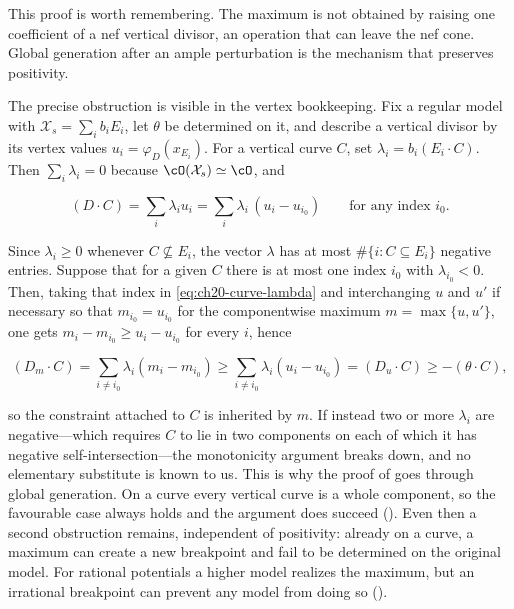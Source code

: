 \begin{remark}
\label{rem:ch20-why-max-is-hard}
This proof is worth remembering.  The maximum is not obtained by raising
one coefficient of a nef vertical divisor, an operation that can leave the
nef cone.  Global generation after an ample perturbation is the mechanism
that preserves positivity.

The precise obstruction is visible in the vertex bookkeeping.  Fix a regular
model with $\mathcal X_s=\sum_ib_iE_i$, let $\theta$ be determined on
it, and describe a vertical divisor by its vertex values
$u_i=\varphi_D(x_{E_i})$.  For a vertical curve $C$, set
$\lambda_i=b_i(E_i\cdot C)$.  Then $\sum_i\lambda_i=0$ because
$\cO(\mathcal X_s)\simeq\cO$, and

\begin{equation}
\label{eq:ch20-curve-lambda}
 (D\cdot C)=\sum_i\lambda_iu_i
 =\sum_{i}\lambda_i\,(u_i-u_{i_0})
 \qquad\text{for any index }i_0 .
\end{equation}

Since $\lambda_i\geq0$ whenever $C\not\subseteq E_i$, the vector
$\lambda$ has at most $\#\{i:C\subseteq E_i\}$ negative entries.  Suppose
that for a given $C$ there is at most one index $i_0$ with
$\lambda_{i_0}<0$.  Then, taking that index in
\eqref{eq:ch20-curve-lambda} and interchanging $u$ and $u'$ if
necessary so that $m_{i_0}=u_{i_0}$ for the componentwise maximum
$m=\max\{u,u'\}$, one gets $m_i-m_{i_0}\geq u_i-u_{i_0}$ for every
$i$, hence

\[
 (D_m\cdot C)=\sum_{i\ne i_0}\lambda_i(m_i-m_{i_0})
 \geq\sum_{i\ne i_0}\lambda_i(u_i-u_{i_0})=(D_u\cdot C)
 \geq-(\theta\cdot C),
\]

so the constraint attached to $C$ is inherited by $m$.  If instead two or
more $\lambda_i$ are negative---which requires $C$ to lie in two
components on each of which it has negative self-intersection---the
monotonicity argument breaks down, and no elementary substitute is known to
us.  This is why the proof of  goes through global
generation.  On a curve every vertical curve is a whole component, so the
favourable case always holds and the argument does succeed
().  Even then a second obstruction remains,
independent of positivity: already on a curve, a maximum can create a new
breakpoint and fail to be determined on the original model.  For rational
potentials a higher model realizes the maximum, but an irrational
breakpoint can prevent any model from doing so
().
\end{remark}

